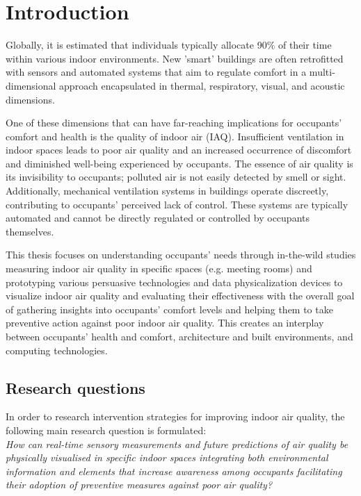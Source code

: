 \section{Introduction}
Globally, it is estimated that individuals typically allocate 90\% of their time within various indoor environments. New 'smart' buildings are often retrofitted with sensors and automated systems that aim to regulate comfort in a multi-dimensional approach encapsulated in thermal, respiratory, visual, and acoustic dimensions. 

One of these dimensions that can have far-reaching implications for occupants' comfort and health is the quality of indoor air (IAQ). Insufficient ventilation in indoor spaces leads to poor air quality and an increased occurrence of discomfort and diminished well-being experienced by occupants. The essence of air quality is its invisibility to occupants; polluted air is not easily detected by smell or sight. Additionally, mechanical ventilation systems in buildings operate discreetly, contributing to occupants' perceived lack of control. These systems are typically automated and cannot be directly regulated or controlled by occupants themselves.

This thesis focuses on understanding occupants' needs through in-the-wild studies measuring indoor air quality in specific spaces (e.g. meeting rooms) and prototyping various persuasive technologies and data physicalization devices to visualize indoor air quality and evaluating their effectiveness with the overall goal of gathering insights into occupants' comfort levels and helping them to take preventive action against poor indoor air quality. This creates an interplay between occupants' health and comfort, architecture and built environments, and computing technologies.



\subsection{Research questions}

In order to research intervention strategies for improving indoor air quality, the following main research question is formulated: \\

\emph{How can real-time sensory measurements and future predictions of air quality be physically visualised in specific indoor spaces integrating both environmental information and elements that increase awareness among occupants facilitating their adoption of preventive measures against poor air quality?} \\


